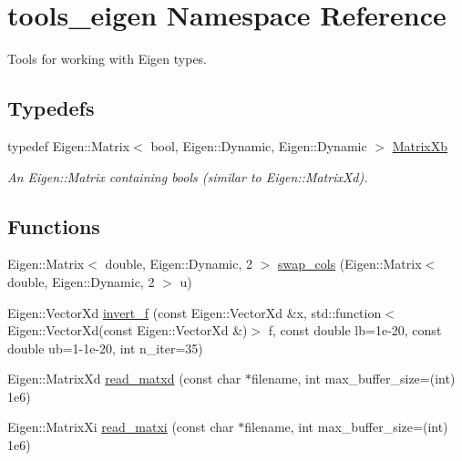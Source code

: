 \hypertarget{namespacetools__eigen}{}\section{tools\+\_\+eigen Namespace Reference}
\label{namespacetools__eigen}


Tools for working with Eigen types.  


\subsection*{Typedefs}
\begin{DoxyCompactItemize}
\item 
typedef Eigen\+::\+Matrix$<$ bool, Eigen\+::\+Dynamic, Eigen\+::\+Dynamic $>$ \hyperlink{namespacetools__eigen_ad496806a2d02c8e881330d95e0c150aa}{Matrix\+Xb}\hypertarget{namespacetools__eigen_ad496806a2d02c8e881330d95e0c150aa}{}\label{namespacetools__eigen_ad496806a2d02c8e881330d95e0c150aa}

\begin{DoxyCompactList}\small\item\em An {\ttfamily Eigen\+::\+Matrix} containing {\ttfamily bool}s (similar to {\ttfamily Eigen\+::\+Matrix\+Xd}). \end{DoxyCompactList}\end{DoxyCompactItemize}
\subsection*{Functions}
\begin{DoxyCompactItemize}
\item 
Eigen\+::\+Matrix$<$ double, Eigen\+::\+Dynamic, 2 $>$ \hyperlink{namespacetools__eigen_a98cfd5525787a027b4ef3060772b102e}{swap\+\_\+cols} (Eigen\+::\+Matrix$<$ double, Eigen\+::\+Dynamic, 2 $>$ u)
\item 
Eigen\+::\+Vector\+Xd \hyperlink{namespacetools__eigen_ab82918b1a8be9985cc97d55da6f8886e}{invert\+\_\+f} (const Eigen\+::\+Vector\+Xd \&x, std\+::function$<$ Eigen\+::\+Vector\+Xd(const Eigen\+::\+Vector\+Xd \&)$>$ f, const double lb=1e-\/20, const double ub=1-\/1e-\/20, int n\+\_\+iter=35)
\item 
Eigen\+::\+Matrix\+Xd \hyperlink{namespacetools__eigen_aef4b2085ca59067d835cecf8115b4da9}{read\+\_\+matxd} (const char $\ast$filename, int max\+\_\+buffer\+\_\+size=(int) 1e6)
\item 
Eigen\+::\+Matrix\+Xi \hyperlink{namespacetools__eigen_a033a550b97fb4ca90245e59f7b971e05}{read\+\_\+matxi} (const char $\ast$filename, int max\+\_\+buffer\+\_\+size=(int) 1e6)
\end{DoxyCompactItemize}


